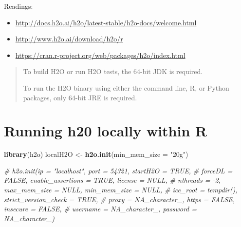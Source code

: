 \documentclass[]{book}
\newenvironment{Shaded}{\begin{snugshade}}{\end{snugshade}}
\newcommand{\KeywordTok}[1]{\textcolor[rgb]{0.13,0.29,0.53}{\textbf{#1}}}
\newcommand{\DataTypeTok}[1]{\textcolor[rgb]{0.13,0.29,0.53}{#1}}
\newcommand{\StringTok}[1]{\textcolor[rgb]{0.31,0.60,0.02}{#1}}
\newcommand{\CommentTok}[1]{\textcolor[rgb]{0.56,0.35,0.01}{\textit{#1}}}
\newcommand{\OtherTok}[1]{\textcolor[rgb]{0.56,0.35,0.01}{#1}}
\newcommand{\ControlFlowTok}[1]{\textcolor[rgb]{0.13,0.29,0.53}{\textbf{#1}}}
\newcommand{\OperatorTok}[1]{\textcolor[rgb]{0.81,0.36,0.00}{\textbf{#1}}}
\newcommand{\NormalTok}[1]{#1}
\theoremstyle{definition}
\theoremstyle{definition}
\theoremstyle{definition}
\theoremstyle{remark}
\begin{document}
Readings:

\begin{itemize}
\item
  \url{http://docs.h2o.ai/h2o/latest-stable/h2o-docs/welcome.html}
\item
  \url{http://www.h2o.ai/download/h2o/r}
\item
  \url{https://cran.r-project.org/web/packages/h2o/index.html}
\end{itemize}

\begin{quote}
To build H2O or run H2O tests, the 64-bit JDK is required.

To run the H2O binary using either the command line, R, or Python
packages, only 64-bit JRE is required.
\end{quote}

\begin{Shaded}
\end{Shaded}

\section{Running h20 locally within
R}\label{running-h20-locally-within-r}

\begin{Shaded}
\begin{Highlighting}[]
\KeywordTok{library}\NormalTok{(h2o)}
\NormalTok{localH2O <-}\StringTok{ }\KeywordTok{h2o.init}\NormalTok{(}\DataTypeTok{min_mem_size =} \StringTok{"20g"}\NormalTok{)}
\end{Highlighting}
\end{Shaded}

\begin{Shaded}
\begin{Highlighting}[]
\CommentTok{# h2o.init(ip = "localhost", port = 54321, startH2O = TRUE,}
\CommentTok{#          forceDL = FALSE, enable_assertions = TRUE, license = NULL,}
\CommentTok{#          nthreads = -2, max_mem_size = NULL, min_mem_size = NULL,}
\CommentTok{#          ice_root = tempdir(), strict_version_check = TRUE,}
\CommentTok{#          proxy = NA_character_, https = FALSE, insecure = FALSE,}
\CommentTok{#          username = NA_character_, password = NA_character_)}
\end{Highlighting}
\end{Shaded}
\end{document}
